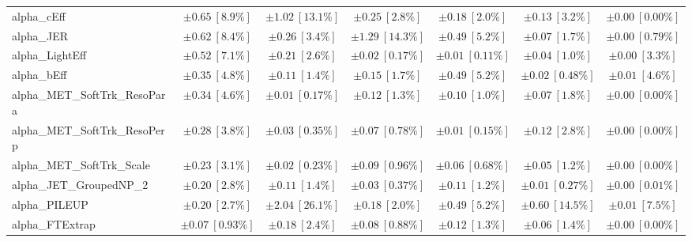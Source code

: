 \begin{sidewaystable}
\begin{center}
\begin{tabular*}{\textwidth}{@{\extracolsep{\fill}}lcccccc}
alpha\_cEff         & $\pm 0.65\ [8.9\%] $          & $\pm 1.02\ [13.1\%] $          & $\pm 0.25\ [2.8\%] $          & $\pm 0.18\ [2.0\%] $          & $\pm 0.13\ [3.2\%] $          & $\pm 0.00\ [0.00\%] $       \\
alpha\_JER         & $\pm 0.62\ [8.4\%] $          & $\pm 0.26\ [3.4\%] $          & $\pm 1.29\ [14.3\%] $          & $\pm 0.49\ [5.2\%] $          & $\pm 0.07\ [1.7\%] $          & $\pm 0.00\ [0.79\%] $       \\
alpha\_LightEff         & $\pm 0.52\ [7.1\%] $          & $\pm 0.21\ [2.6\%] $          & $\pm 0.02\ [0.17\%] $          & $\pm 0.01\ [0.11\%] $          & $\pm 0.04\ [1.0\%] $          & $\pm 0.00\ [3.3\%] $       \\
alpha\_bEff         & $\pm 0.35\ [4.8\%] $          & $\pm 0.11\ [1.4\%] $          & $\pm 0.15\ [1.7\%] $          & $\pm 0.49\ [5.2\%] $          & $\pm 0.02\ [0.48\%] $          & $\pm 0.01\ [4.6\%] $       \\
alpha\_MET\_SoftTrk\_ResoPara         & $\pm 0.34\ [4.6\%] $          & $\pm 0.01\ [0.17\%] $          & $\pm 0.12\ [1.3\%] $          & $\pm 0.10\ [1.0\%] $          & $\pm 0.07\ [1.8\%] $          & $\pm 0.00\ [0.00\%] $       \\
alpha\_MET\_SoftTrk\_ResoPerp         & $\pm 0.28\ [3.8\%] $          & $\pm 0.03\ [0.35\%] $          & $\pm 0.07\ [0.78\%] $          & $\pm 0.01\ [0.15\%] $          & $\pm 0.12\ [2.8\%] $          & $\pm 0.00\ [0.00\%] $       \\
alpha\_MET\_SoftTrk\_Scale         & $\pm 0.23\ [3.1\%] $          & $\pm 0.02\ [0.23\%] $          & $\pm 0.09\ [0.96\%] $          & $\pm 0.06\ [0.68\%] $          & $\pm 0.05\ [1.2\%] $          & $\pm 0.00\ [0.00\%] $       \\
alpha\_JET\_GroupedNP\_2         & $\pm 0.20\ [2.8\%] $          & $\pm 0.11\ [1.4\%] $          & $\pm 0.03\ [0.37\%] $          & $\pm 0.11\ [1.2\%] $          & $\pm 0.01\ [0.27\%] $          & $\pm 0.00\ [0.01\%] $       \\
alpha\_PILEUP         & $\pm 0.20\ [2.7\%] $          & $\pm 2.04\ [26.1\%] $          & $\pm 0.18\ [2.0\%] $          & $\pm 0.49\ [5.2\%] $          & $\pm 0.60\ [14.5\%] $          & $\pm 0.01\ [7.5\%] $       \\
alpha\_FTExtrap         & $\pm 0.07\ [0.93\%] $          & $\pm 0.18\ [2.4\%] $          & $\pm 0.08\ [0.88\%] $          & $\pm 0.12\ [1.3\%] $          & $\pm 0.06\ [1.4\%] $          & $\pm 0.00\ [0.00\%] $       \\

\end{tabular*}
\end{center}
\end{sidewaystable}
